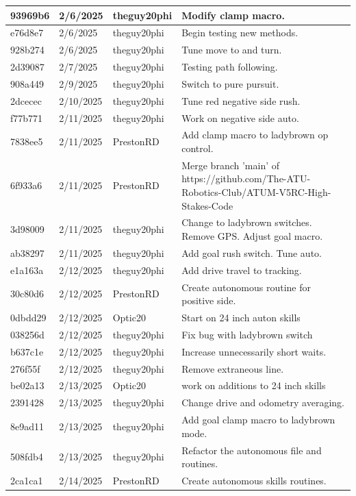 \begin{center}
\begin{longtable}{|p{28pt}|p{33pt}|p{40pt}|p{300pt}|}
\hline
93969b6 & 2/6/2025 & theguy20phi & Modify clamp macro. \\
\hline
e76d8e7 & 2/6/2025 & theguy20phi & Begin testing new methods. \\
\hline
928b274 & 2/6/2025 & theguy20phi & Tune move to and turn. \\
\hline
2d39087 & 2/7/2025 & theguy20phi & Testing path following. \\
\hline
908a449 & 2/9/2025 & theguy20phi & Switch to pure pursuit. \\
\hline
2dcecec & 2/10/2025 & theguy20phi & Tune red negative side rush. \\
\hline
f77b771 & 2/11/2025 & theguy20phi & Work on negative side auto. \\
\hline
7838ee5 & 2/11/2025 & PrestonRD & Add clamp macro to ladybrown op control. \\
\hline
6f933a6 & 2/11/2025 & PrestonRD & Merge branch 'main' of https://github.com/The-ATU-Robotics-Club/ATUM-V5RC-High-Stakes-Code \\
\hline
3d98009 & 2/11/2025 & theguy20phi & Change to ladybrown switches. Remove GPS. Adjust goal macro. \\
\hline
ab38297 & 2/11/2025 & theguy20phi & Add goal rush switch. Tune auto. \\
\hline
e1a163a & 2/12/2025 & theguy20phi & Add drive travel to tracking. \\
\hline
30c80d6 & 2/12/2025 & PrestonRD & Create autonomous routine for positive side. \\
\hline
0dbdd29 & 2/12/2025 & Optic20 & Start on 24 inch auton skills \\
\hline
038256d & 2/12/2025 & theguy20phi & Fix bug with ladybrown switch \\
\hline
b637c1e & 2/12/2025 & theguy20phi & Increase unnecessarily short waits. \\
\hline
276f55f & 2/12/2025 & theguy20phi & Remove extraneous line. \\
\hline
be02a13 & 2/13/2025 & Optic20 & work on additions to 24 inch skills \\
\hline
2391428 & 2/13/2025 & theguy20phi & Change drive and odometry averaging. \\
\hline
8e9ad11 & 2/13/2025 & theguy20phi & Add goal clamp macro to ladybrown mode. \\
\hline
508fdb4 & 2/13/2025 & theguy20phi & Refactor the autonomous file and routines. \\
\hline
2ca1ca1 & 2/14/2025 & PrestonRD & Create autonomous skills routines. \\

\end{longtable}
\end{center}
